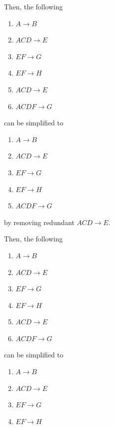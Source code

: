 \documentclass[12pt]{article}
\begin{document}
\begin{enumerate}[1.]
\begin{itemize}
            \bigskip

            Then, the following

            \begin{enumerate}[1.]
                \item $A \to B$
                \item $ACD \to E$
                \item $EF \to G$
                \item $EF \to H$
                \item $ACD \to E$
                \item $ACDF \to G$
            \end{enumerate}

            can be simplified to

            \begin{enumerate}[1.]
                \item $A \to B$
                \item $ACD \to E$
                \item $EF \to G$
                \item $EF \to H$
                \item $ACDF \to G$
            \end{enumerate}

            by removing redundant $ACD \to E$.

            \bigskip

            Then, the following

            \begin{enumerate}[1.]
                \item $A \to B$
                \item $ACD \to E$
                \item $EF \to G$
                \item $EF \to H$
                \item $ACD \to E$
                \item $ACDF \to G$
            \end{enumerate}

            can be simplified to

            \begin{enumerate}[1.]
                \item $A \to B$
                \item $ACD \to E$
                \item $EF \to G$
                \item $EF \to H$
            \end{enumerate}


\end{itemize}
\end{enumerate}
\end{document}
